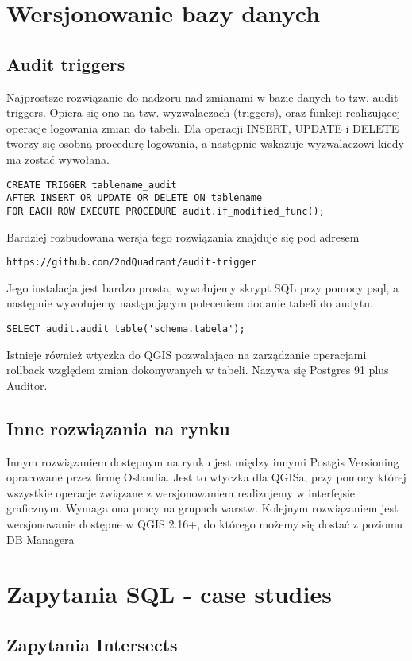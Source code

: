\chapter{Wersjonowanie bazy danych}
	\section{Audit triggers}
Najprostsze rozwiązanie do nadzoru nad zmianami w bazie danych to tzw. audit triggers. Opiera się ono na tzw. wyzwalaczach (triggers), oraz funkcji realizującej operacje logowania zmian do tabeli. Dla operacji INSERT, UPDATE i DELETE tworzy się osobną procedurę logowania, a następnie wskazuje wyzwalaczowi kiedy ma zostać wywołana.
\begin{lstlisting}
CREATE TRIGGER tablename_audit
AFTER INSERT OR UPDATE OR DELETE ON tablename
FOR EACH ROW EXECUTE PROCEDURE audit.if_modified_func();
\end{lstlisting}	

Bardziej rozbudowana wersja tego rozwiązania znajduje się pod adresem 
\begin{lstlisting}
https://github.com/2ndQuadrant/audit-trigger
\end{lstlisting}
Jego instalacja jest bardzo prosta, wywołujemy skrypt SQL przy pomocy psql, a następnie wywołujemy następującym poleceniem dodanie tabeli do audytu.
\begin{lstlisting}
SELECT audit.audit_table('schema.tabela');
\end{lstlisting}
	Istnieje również wtyczka do QGIS pozwalająca na zarządzanie operacjami rollback względem zmian dokonywanych w tabeli. Nazywa się Postgres 91 plus Auditor.
	\section{Inne rozwiązania na rynku}
	Innym rozwiązaniem dostępnym na rynku jest między innymi Postgis Versioning opracowane przez firmę Oslandia. Jest to wtyczka dla QGISa, przy pomocy której wszystkie operacje związane z wersjonowaniem realizujemy w interfejsie graficznym. Wymaga ona pracy na grupach warstw. 
	Kolejnym rozwiązaniem jest wersjonowanie dostępne w QGIS 2.16+, do którego możemy się dostać z poziomu DB Managera
\chapter{Zapytania SQL - case studies}

\section{Zapytania Intersects}

